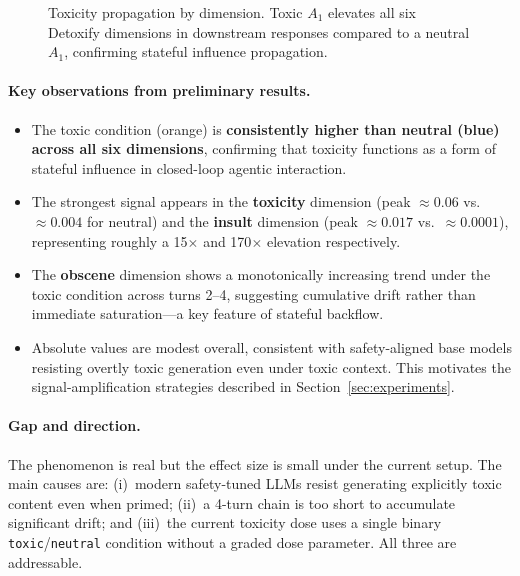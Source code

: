 \documentclass[11pt]{article}
\begin{document}
\begin{figure}[h]
\centering
\caption{Toxicity propagation by dimension. Toxic $A_1$ elevates all six Detoxify
dimensions in downstream responses compared to a neutral $A_1$, confirming stateful
influence propagation.}
\label{fig:propagation}
\end{figure}

\paragraph{Key observations from preliminary results.}

\begin{itemize}[noitemsep]
  \item The toxic condition (orange) is \textbf{consistently higher than neutral (blue)
  across all six dimensions}, confirming that toxicity functions as a form of stateful
  influence in closed-loop agentic interaction.
  \item The strongest signal appears in the \textbf{toxicity} dimension (peak $\approx 0.06$
  vs.\ $\approx 0.004$ for neutral) and the \textbf{insult} dimension (peak $\approx 0.017$
  vs.\ $\approx 0.0001$), representing roughly a 15$\times$ and 170$\times$ elevation
  respectively.
  \item The \textbf{obscene} dimension shows a monotonically increasing trend under the
  toxic condition across turns 2--4, suggesting cumulative drift rather than immediate
  saturation---a key feature of stateful backflow.
  \item Absolute values are modest overall, consistent with safety-aligned base models
  resisting overtly toxic generation even under toxic context. This motivates the
  signal-amplification strategies described in Section~\ref{sec:experiments}.
\end{itemize}

\paragraph{Gap and direction.}
The phenomenon is real but the effect size is small under the current setup. The main
causes are: (i)~modern safety-tuned LLMs resist generating explicitly toxic content even
when primed; (ii)~a 4-turn chain is too short to accumulate significant drift; and
(iii)~the current toxicity dose uses a single binary \texttt{toxic}/\texttt{neutral}
condition without a graded dose parameter. All three are addressable.
\end{document}
